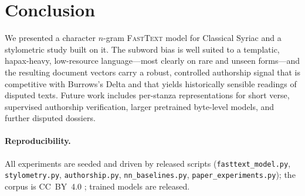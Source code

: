 \documentclass[11pt]{article}
\begin{document}
\section{Conclusion}
\label{sec:conclusion}
We presented a character $n$-gram \textsc{FastText} model for Classical Syriac
and a stylometric study built on it. The subword bias is well suited to a
templatic, hapax-heavy, low-resource language---most clearly on rare and unseen
forms---and the resulting document vectors carry a robust, controlled authorship
signal that is competitive with Burrows's Delta and that yields historically
sensible readings of disputed texts. Future work includes per-stanza
representations for short verse, supervised authorship verification, larger
pretrained byte-level models, and further disputed dossiers.

\paragraph{Reproducibility.}
All experiments are seeded and driven by released scripts
(\texttt{fasttext\_model.py}, \texttt{stylometry.py}, \texttt{authorship.py},
\texttt{nn\_baselines.py}, \texttt{paper\_experiments.py}); the corpus is
CC~BY~4.0 \cite{digitalsyriaccorpus}; trained models are released.



\end{document}
